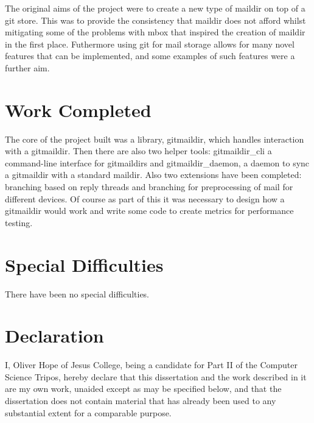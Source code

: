 \documentclass[12pt,a4paper,twoside,openright]{report}
\begin{document}
The original aims of the project were to create a new type of maildir\cite{maildir-man} on top of a git store. This was to provide the consistency that maildir does not afford whilst mitigating some of the problems with mbox that inspired the creation of maildir in the first place. Futhermore using git for mail storage allows for many novel features that can be implemented, and some examples of such features were a further aim.

\section*{Work Completed}

The core of the project built was a library, gitmaildir, which handles interaction with a gitmaildir. Then there are also two helper tools: gitmaildir\_cli a command-line interface for gitmaildirs and gitmaildir\_daemon, a daemon to sync a gitmaildir with a standard maildir. Also two extensions have been completed: branching based on reply threads and branching for preprocessing of mail for different devices. Of course as part of this it was necessary to design how a gitmaildir would work and write some code to create metrics for performance testing.

\section*{Special Difficulties}

There have been no special difficulties.

\newpage
\section*{Declaration}

I, Oliver Hope of Jesus College, being a candidate for Part II of the Computer
Science Tripos, hereby declare
that this dissertation and the work described in it are my own work,
unaided except as may be specified below, and that the dissertation
does not contain material that has already been used to any substantial
extent for a comparable purpose.

\bigskip
{}

\medskip
{}

\tableofcontents

\listoffigures

\newpage
\end{document}
